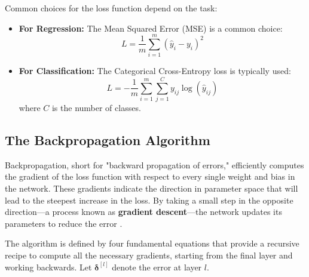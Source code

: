 Common choices for the loss function depend on the task:
\begin{itemize}
    \item \textbf{For Regression:} The Mean Squared Error (MSE) is a common choice:
    \begin{equation}
        L = \frac{1}{m} \sum_{i=1}^m (\hat{y}_i - y_i)^2
    \end{equation}
    \item \textbf{For Classification:} The Categorical Cross-Entropy loss is typically used:
    \begin{equation}
        L = -\frac{1}{m} \sum_{i=1}^m \sum_{j=1}^{C} y_{ij} \log(\hat{y}_{ij})
    \end{equation}
    where $C$ is the number of classes.
\end{itemize}

\subsection{The Backpropagation Algorithm}
Backpropagation, short for "backward propagation of errors," efficiently computes the gradient of the loss function with respect to every single weight and bias in the network. These gradients indicate the direction in parameter space that will lead to the steepest increase in the loss. By taking a small step in the opposite direction—a process known as \textbf{gradient descent}—the network updates its parameters to reduce the error \cite{Bottou2018Optimization}.

The algorithm is defined by four fundamental equations that provide a recursive recipe to compute all the necessary gradients, starting from the final layer and working backwards. Let $\boldsymbol{\delta}^{[l]}$ denote the error at layer $l$.

